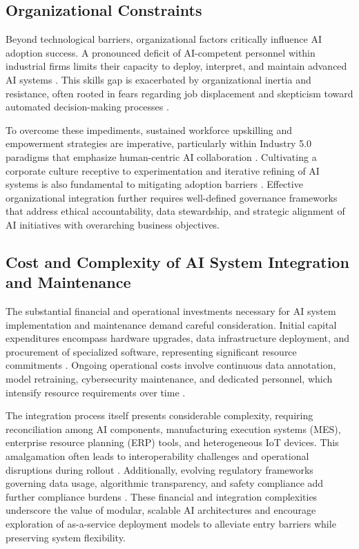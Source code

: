 \documentclass[11pt]{article}
\begin{document}
\subsection{Organizational Constraints}

Beyond technological barriers, organizational factors critically influence AI adoption success. A pronounced deficit of AI-competent personnel within industrial firms limits their capacity to deploy, interpret, and maintain advanced AI systems \cite{ref7,ref26}. This skills gap is exacerbated by organizational inertia and resistance, often rooted in fears regarding job displacement and skepticism toward automated decision-making processes \cite{ref3,ref26}.

To overcome these impediments, sustained workforce upskilling and empowerment strategies are imperative, particularly within Industry 5.0 paradigms that emphasize human-centric AI collaboration \cite{ref3}. Cultivating a corporate culture receptive to experimentation and iterative refining of AI systems is also fundamental to mitigating adoption barriers \cite{ref26,ref38}. Effective organizational integration further requires well-defined governance frameworks that address ethical accountability, data stewardship, and strategic alignment of AI initiatives with overarching business objectives.

\subsection{Cost and Complexity of AI System Integration and Maintenance}

The substantial financial and operational investments necessary for AI system implementation and maintenance demand careful consideration. Initial capital expenditures encompass hardware upgrades, data infrastructure deployment, and procurement of specialized software, representing significant resource commitments \cite{ref11,ref12,ref35}. Ongoing operational costs involve continuous data annotation, model retraining, cybersecurity maintenance, and dedicated personnel, which intensify resource requirements over time \cite{ref7,ref9,ref20}.

The integration process itself presents considerable complexity, requiring reconciliation among AI components, manufacturing execution systems (MES), enterprise resource planning (ERP) tools, and heterogeneous IoT devices. This amalgamation often leads to interoperability challenges and operational disruptions during rollout \cite{ref6,ref44}. Additionally, evolving regulatory frameworks governing data usage, algorithmic transparency, and safety compliance add further compliance burdens \cite{ref2,ref13}. These financial and integration complexities underscore the value of modular, scalable AI architectures and encourage exploration of as-a-service deployment models to alleviate entry barriers while preserving system flexibility.
\end{document}
